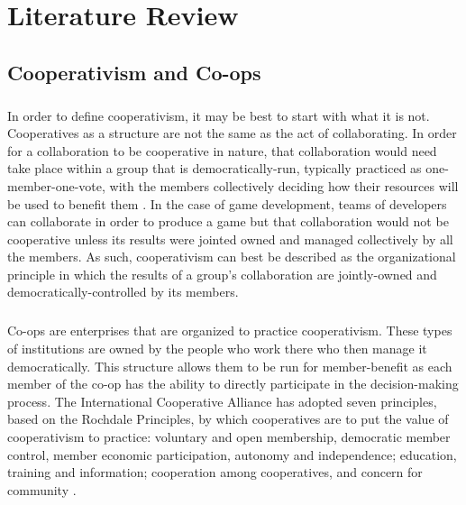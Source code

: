 \chapter{Literature Review}

\section{Cooperativism and Co-ops}

\paragraph{} In order to define cooperativism, it may be best to start with what it is not. Cooperatives as a structure are not the same as the act of collaborating. In order for a collaboration to be cooperative in nature, that collaboration would need take place within a group that is democratically-run, typically practiced as one-member-one-vote, with the members collectively deciding how their resources will be used to benefit them \autocite[54]{ratner_cooperativism_2009}. In the case of game development, teams of developers can collaborate in order to produce a game but that collaboration would not be cooperative unless its results were jointed owned and managed collectively by all the members. As such, cooperativism can best be described as the organizational principle in which the results of a group's collaboration are jointly-owned and democratically-controlled by its members.

\paragraph{} Co-ops are enterprises that are organized to practice cooperativism. These types of institutions are owned by the people who work there who then manage it democratically. This structure allows them to be run for member-benefit as each member of the co-op has the ability to directly participate in the decision-making process. The International Cooperative Alliance has adopted seven principles, based on the Rochdale Principles, by which cooperatives are to put the value of cooperativism to practice: voluntary and open membership, democratic member control, member economic participation, autonomy and independence; education, training and information; cooperation among cooperatives, and concern for community \nocite{international_cooperative_alliance_cooperative_nodate}.

\paragraph{}

